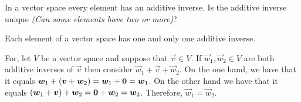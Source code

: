 
\begin{Exercise}[
name={},
title={}, 
difficulty=0,
origin={\cite{JH}}]
In a vector space every element has an additive inverse.
Is the additive inverse unique \textit{(Can some elements have two or more)}?
\end{Exercise}

\begin{Answer}



Each element of a vector space has one and only one additive
inverse.

For, let \( V \) be a vector space and suppose that \( \vec{v}\in V \).
If \( \vec{w}_1,\vec{w}_2\in V \) are both additive inverses of
\( \vec{v} \) then consider \( \vec{w}_1+\vec{v}+\vec{w}_2 \).
On the one hand, we have that it equals $\bm{w}_1+(\bm{v}+\bm{w}_2)=
\bm{w}_1+\bm{0}=\bm{w}_1$.
On the other hand we have that it equals $(\bm{w}_1+\bm{v})+\bm{w}_2=
\bm{0}+\bm{w}_2=\bm{w}_2$.
Therefore, $\vec{w}_1=\vec{w}_2$.

\end{Answer}
